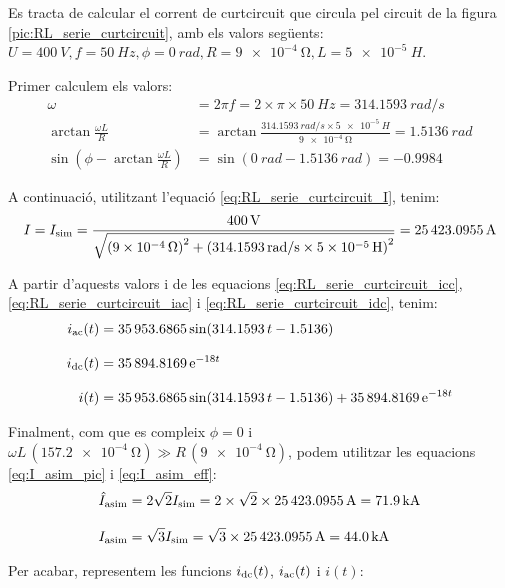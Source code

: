 \begin{exemple}\label{ex:CurtcircuitRL}
	\addcontentsxms{\CurtcircuitRL}		
    Es tracta de calcular el corrent de curtcircuit que circula pel circuit de la figura \vref{pic:RL_serie_curtcircuit}, amb els valors següents: $U=\qty{400}{V}, f=\qty{50}{Hz}, \phi=\qty{0}{rad}, R=\qty{9e-4}{\ohm}, L=\qty{5e-5}{H}$.

    Primer calculem els valors:
    \begin{align*}
        \omega &= 2\pi f = 2\times\pi\times\qty{50}{Hz} = \qty{314,1593}{rad/s} \\[3mm]
        \arctan\frac{\omega L}{R} &= \arctan\frac{\qty{314,1593}{rad/s}\times\qty{5e-5}{H}}{\qty{9e-4}{\ohm}} =
        \qty{1,5136}{rad}\\[3mm]
        \sin\left(\phi - \arctan\frac{\omega L}{R}\right) &= \sin(\qty{0}{rad} - \qty{1,5136}{rad})= \num{-0,9984}
    \end{align*}


    A continuació, utilitzant l'equació \eqref{eq:RL_serie_curtcircuit_I}, tenim:
    \[
        I= I_\mathrm{sim} =\frac{\qty{400}{V}}{\sqrt{\left(\qty{9e-4}{\ohm}\right)^2+\left(\qty{314,1593}{rad/s}\times \qty{5e-5}{H}\right)^2}} =
        \qty{25423,0955}{A}
    \]

      A partir d'aquests valors i de les equacions \eqref{eq:RL_serie_curtcircuit_icc}, \eqref{eq:RL_serie_curtcircuit_iac} i \eqref{eq:RL_serie_curtcircuit_idc}, tenim:
    \begin{align*}
        i_\mathrm{ac}(t) &= \num{35953,6865}\sin(\num{314,1593}\,t-\num{1,5136}) \\[0.3cm]
        i_\mathrm{dc}(t) &= \num{35894,8169}\,\mathrm{e}^{-18 t}\\[0.3cm]
        i(t) &= \num{35953,6865}\sin(\num{314,1593}\,t-\num{1,5136}) + \num{35894,8169}\,\mathrm{e}^{-18 t}
    \end{align*}

    Finalment, com que es compleix $\phi=0$ i $\omega L \,(\qty{157,2e-4}{\ohm}) \gg R\, (\qty{9e-4}{\ohm}) $, podem utilitzar les equacions \eqref{eq:I_asim_pic} i \eqref{eq:I_asim_eff}:
    \begin{align*}
        \hat{I}_\mathrm{asim} &= 2 \sqrt{2} I_\mathrm{sim}= 2 \times \sqrt{2} \times \qty{25423,0955}{A} = \qty{71,9}{kA}\\[0.3cm]
        I_\mathrm{asim} &= \sqrt{3} I_\mathrm{sim}= \sqrt{3} \times \qty{25423,0955}{A} = \qty{44,0}{kA}
    \end{align*}

    Per acabar, representem les funcions $i_\mathrm{dc}(t)$, $i_\mathrm{ac}(t)$ i $i(t)$:
    \begin{center}
        
    \end{center}
\end{exemple}


